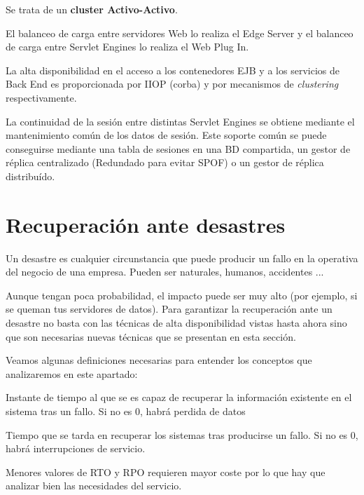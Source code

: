 \documentclass{apuntes}[nochap]
\begin{document}
\begin{enumerate}
\begin{example}
Se trata de un \textbf{cluster Activo-Activo}.

El balanceo de carga entre servidores Web lo realiza el Edge Server y el balanceo de carga entre Servlet Engines lo realiza el Web Plug In.

La alta disponibilidad en el acceso a los contenedores EJB y a los servicios de Back End es proporcionada por IIOP (corba) y por mecanismos de \textit{clustering} respectivamente.

La continuidad de la sesión entre distintas Servlet Engines se obtiene mediante el mantenimiento común de los datos de sesión. Este soporte común se puede conseguirse mediante una tabla de sesiones en una BD compartida, un gestor de réplica centralizado (Redundado para evitar SPOF) o un gestor de réplica distribuído.
\end{example}

\end{enumerate}

\section{Recuperación ante desastres}

Un desastre es cualquier circunstancia que puede producir un fallo en la operativa del negocio de una empresa. Pueden ser naturales, humanos, accidentes ...

Aunque tengan poca probabilidad, el impacto puede ser muy alto (por ejemplo, si se queman tus servidores de datos). Para garantizar la recuperación ante un desastre no basta con las técnicas de alta disponibilidad vistas hasta ahora sino que son necesarias nuevas técnicas que se presentan en esta sección.

Veamos algunas definiciones necesarias para entender los conceptos que analizaremos en este apartado:

\begin{defn}
Instante de tiempo al que se es capaz de recuperar la información existente en el sistema tras un fallo. Si no es 0, habrá perdida de datos
\end{defn}

\begin{defn}
Tiempo que se tarda en recuperar los sistemas tras producirse un fallo. Si no es 0, habrá interrupciones de servicio.
\end{defn}

Menores valores de RTO y RPO requieren mayor coste por lo que hay que analizar bien las necesidades del servicio.
\end{document}

